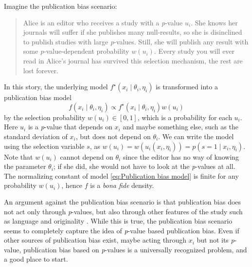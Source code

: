 \documentclass[useAMS,usenatbib,referee]{biom}
\begin{document}
Imagine the publication bias scenario:
\begin{quote}
Alice is an editor who receives a study with a \textit{p}-value $u_i$. She knows her journals will suffer if she publishes many null-results, so she is disinclined to publish studies with large \textit{p}-values. Still, she will publish any result with some \textit{p}-value-dependent probability $w(u_i)$. Every study you will ever read in Alice's journal has survived this selection mechanism, the rest are lost forever.
\end{quote}
In this story, the underlying model $f^{\star}(x_{i}\mid\theta_{i},\eta_{i})$ is transformed into a publication bias model
\vspace{-9mm}
\begin{equation}\label{eq:Publication bias model}
f(x_{i}\mid\theta_{i},\eta_{i})\propto f^{\star}(x_{i}\mid\theta_{i},\eta_{i})w(u_i)
\end{equation}
by the selection probability $w(u_i) \in [0,1]$, which is a probability for each $u_i$. Here $u_i$ is a \textit{p}-value that depends on $x_{i}$ and maybe something else, such as the standard deviation of $x_{i}$, but does not depend on $\theta_{i}$. We can write the model using the selection variable $s$, as $w(u_i) = w(u_i(x_i, \eta_i)) = p(s=1 \mid x_i, \eta_i)$. Note that $w(u_i)$ cannot depend on $\theta_{i}$ since the editor has no way of knowing the parameter $\theta_{i}$; if she did, she would not have to look at the \textit{p}-values at all. The normalizing constant of model \eqref{eq:Publication bias model} is finite for any probability $w(u_i)$, hence $f$ is a \textit{bona fide} density.

An argument against the publication bias scenario is that publication bias does not act only through \textit{p}-values, but also through other features of the study such as language \citep{egger1998meta}
and originality \citep{callaham1998positive}. While this is true, the publication bias scenario seems to completely capture the idea of \textit{p}-value based publication bias. Even if other sources of publication bias exist, maybe acting through $x_{i}$ but not its \textit{p}-value, publication bias based on \textit{p}-values is a universally recognized problem, and a good place to start.
\end{document}
